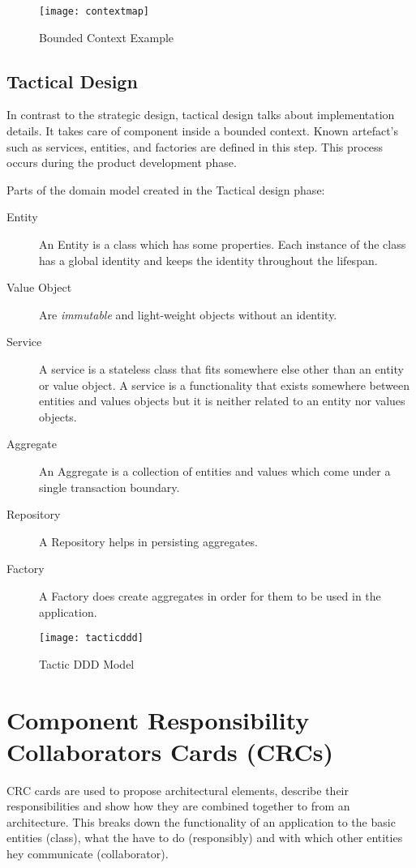 \begin{figure}[H]
  \center
  \texttt{[image: contextmap]}
  \caption{Bounded Context Example}
  \label{fig:contextmap}
\end{figure}

\pagebreak

\subsection{Tactical Design}
In contrast to the strategic design, tactical design talks about implementation details. It takes care of component inside a bounded context. Known artefact's such as services, entities, and factories are defined in this step. This process occurs during the product development phase.

Parts of the domain model created in the Tactical design phase:
\begin{description}
  \item [Entity] An Entity is a class which has some properties. Each instance of the class has a global identity and keeps the identity throughout the lifespan.
  \item [Value Object] Are \textit{immutable} and light-weight objects without an identity.
  \item [Service] A service is a stateless class that fits somewhere else other than an entity or value object. A service is a functionality that exists somewhere between entities and values objects but it is neither related to an entity nor values objects.
  \item [Aggregate] An Aggregate is a collection of entities and values which come under a single transaction boundary.
  \item [Repository] A Repository helps in persisting aggregates.
  \item [Factory] A Factory does create aggregates in order for them to be used in the application.
\end{description}

\begin{figure}[H]
  \center
  \texttt{[image: tacticddd]}
  \caption{Tactic DDD Model}
\end{figure}

\section{Component Responsibility Collaborators Cards (CRCs)}
CRC cards are used to propose architectural elements, describe their responsibilities and show how they are combined together to from an architecture. This breaks down the functionality of an application to the basic entities (class), what the have to do (responsibly) and with which other entities hey communicate (collaborator).

